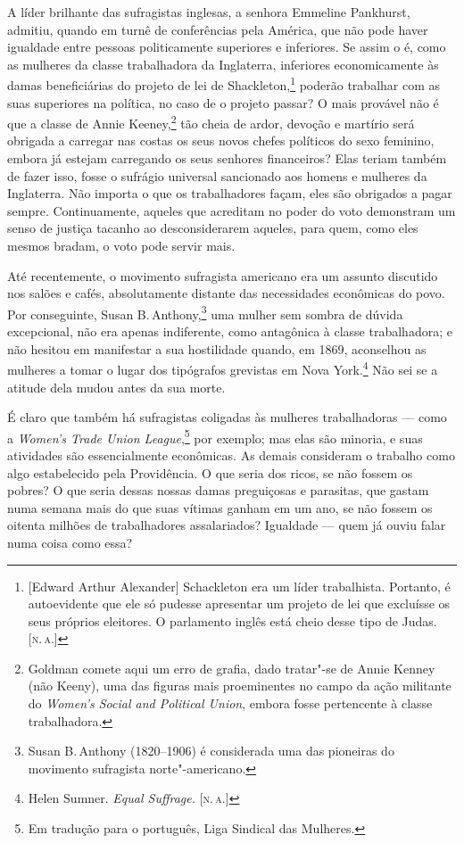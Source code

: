 A líder brilhante das sufragistas inglesas, a senhora Emmeline
Pankhurst, admitiu, quando em turnê de conferências pela América, que não
pode haver igualdade entre pessoas politicamente superiores e
inferiores. Se assim o é, como as mulheres da classe trabalhadora da
Inglaterra, inferiores economicamente às damas beneficiárias do projeto
de lei de Shackleton,\footnote{{[}Edward Arthur Alexander{]} Schackleton
  era um líder trabalhista. Portanto, é autoevidente que ele só pudesse
  apresentar um projeto de lei que excluísse os seus próprios eleitores.
  O parlamento inglês está cheio desse tipo de Judas. [\textsc{n.\,a.}]} poderão
trabalhar com as suas superiores na política, no caso de o projeto passar? 
O mais provável não é que a classe de Annie Keeney,\footnote{Goldman comete aqui um
  erro de grafia, dado tratar"-se de Annie Kenney (não Keeny), uma das
  figuras mais proeminentes no campo da ação militante do \textit{Women's
  Social and Political Union}, embora fosse pertencente à classe
  trabalhadora.} tão cheia de ardor, devoção e martírio será obrigada a
carregar nas costas os seus novos chefes políticos do sexo feminino, embora já
estejam carregando os seus senhores financeiros? Elas teriam também de
fazer isso, fosse o sufrágio universal sancionado aos homens e mulheres da
Inglaterra. Não importa o que os trabalhadores façam, eles são obrigados
a pagar sempre. Continuamente, aqueles que acreditam no poder do voto
demonstram um senso de justiça tacanho ao desconsiderarem aqueles, para
quem, como eles mesmos bradam, o voto pode servir mais.

Até recentemente, o movimento sufragista americano era um assunto
discutido nos salões e cafés, absolutamente distante das necessidades
econômicas do povo. Por conseguinte, Susan B.\,Anthony,\footnote{Susan B.\,Anthony (1820--1906) é considerada uma das pioneiras do movimento sufragista norte"-americano.} uma mulher sem
sombra de dúvida excepcional, não era apenas indiferente, como
antagônica à classe trabalhadora; e não hesitou em manifestar a sua
hostilidade quando, em 1869, aconselhou as mulheres a tomar o lugar dos
tipógrafos grevistas em Nova York.\footnote{Helen Sumner. \textit{Equal
  Suffrage.} [\textsc{n.\,a.}]} Não sei se a atitude dela mudou antes da sua morte.

É claro que também há sufragistas coligadas às mulheres trabalhadoras
--- como a \textit{Women's Trade Union League},\footnote{Em tradução para o português, Liga Sindical das
Mulheres.} por exemplo; mas elas são minoria, e suas atividades
são essencialmente econômicas. As demais consideram o trabalho como algo
estabelecido pela Providência. O que seria dos ricos, se não fossem
os pobres? O que seria dessas nossas damas preguiçosas e parasitas, que
gastam numa semana mais do que suas vítimas ganham em um ano, se não
fossem os oitenta milhões de trabalhadores assalariados? Igualdade --- quem já ouviu falar numa coisa como essa?

